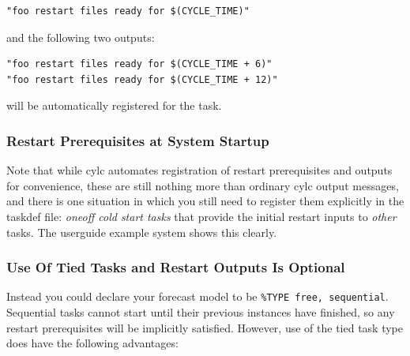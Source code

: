 \documentclass[11pt,a4paper]{article}
\begin{document}
\begin{lstlisting}
"foo restart files ready for $(CYCLE_TIME)"
\end{lstlisting}

and the following two outputs:

\begin{lstlisting}
"foo restart files ready for $(CYCLE_TIME + 6)"
"foo restart files ready for $(CYCLE_TIME + 12)"
\end{lstlisting}

will be automatically registered for the task.


\subsubsection{Restart Prerequisites at System Startup}

Note that while cylc automates registration of restart prerequisites and 
outputs for convenience, these are still nothing more than ordinary cylc
output messages, and there is one situation in which you still need to
register them explicitly in the taskdef file: {\em oneoff cold start
tasks} that provide the initial restart inputs to {\em other} tasks.
The userguide example system shows this clearly.



\subsubsection{Use Of Tied Tasks and Restart Outputs Is Optional}

Instead you could declare your forecast model to be 
\lstinline=%TYPE free, sequential=. 
Sequential tasks cannot start until their previous instances have
finished, so any restart prerequisites will be implicitly satisfied.
However, use of the tied task type does have the following advantages:
\end{document}
